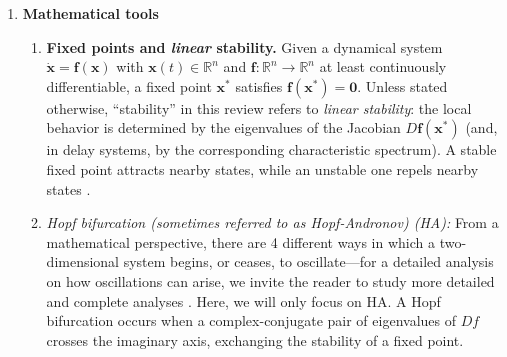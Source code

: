 \documentclass[12pt]{article}
\numberwithin{equation}{section}
\newcommand{\rev}[1]{\begingroup\color{navyblue}#1\endgroup}
\begin{document}
\begin{enumerate}
\begin{enumerate}
\item \emph{Coupling} \rev{is forcing generated by other nodes: one neural mass serves as a
time-dependent drive for another.
Coupling may be instantaneous or delayed, linear or nonlinear, and weak or strong.
In the weak-coupling/strong-attraction regime, coupling often reduces to an effective
interaction between phases (yielding generalized Kuramoto-type descriptions); outside that
regime, amplitude effects (and possibly multistability) become central.
External stimulation can be viewed as a degenerate form of coupling in which the ``partner''
signal is prescribed by the experimenter or device.}\cite{Pikovsky2003,Abrams2004}.  

 
\end{enumerate}


\item \textbf{Mathematical tools}
\begin{enumerate}
\item 
\rev{\textbf{Fixed points and \emph{linear} stability.}
Given a dynamical system $\dot{\mathbf{x}}=\mathbf{f}(\mathbf{x})$ with
$\mathbf{x}(t)\in\mathbb{R}^n$ and $\mathbf{f}:\mathbb{R}^n\to\mathbb{R}^n$ at least
continuously differentiable, a fixed point $\mathbf{x}^\ast$ satisfies
$\mathbf{f}(\mathbf{x}^\ast)=\mathbf{0}$.
Unless stated otherwise, ``stability'' in this review refers to \emph{linear stability}:
the local behavior is determined by the eigenvalues of the Jacobian
$D\mathbf{f}(\mathbf{x}^\ast)$ (and, in delay systems, by the corresponding characteristic
spectrum).}
A stable fixed point attracts nearby states, while an unstable one repels nearby states \cite{strogatz2018nonlinear}.
\item \textit{Hopf bifurcation (sometimes referred to as \textit{Hopf-Andronov}) (HA):} From a mathematical perspective, there are 4 different ways in which a two-dimensional system begins, or ceases, to oscillate—for a detailed analysis on how oscillations can arise, we invite the reader to study more detailed and complete analyses  \cite{strogatz2018nonlinear,hoppensteadt2012weakly,kuznetsov2023elements}. Here, we will only focus on HA.
\rev{A Hopf bifurcation occurs when a complex-conjugate pair of eigenvalues of $Df$ crosses the imaginary axis, exchanging the stability of a fixed point.}


\end{enumerate}
\end{enumerate}
\end{document}
